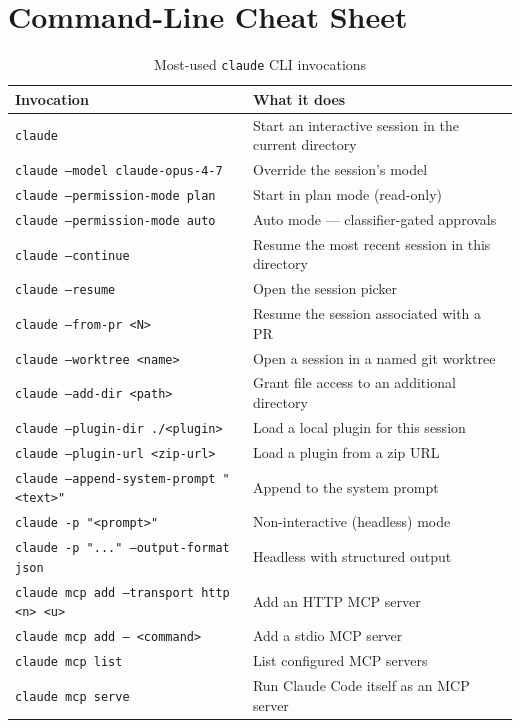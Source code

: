 \section{Command-Line Cheat Sheet}
\label{app:cli-cheat}

\begin{table}[ht]
\centering
\caption{Most-used \texttt{claude} CLI invocations}
\label{tab:app-cli}
\begin{tabularx}{\textwidth}{lX}
\toprule
\textbf{Invocation} & \textbf{What it does} \\
\midrule
\texttt{claude}                                  & Start an interactive session in the current directory \\
\texttt{claude --model claude-opus-4-7}          & Override the session's model \\
\texttt{claude --permission-mode plan}           & Start in plan mode (read-only) \\
\texttt{claude --permission-mode auto}           & Auto mode — classifier-gated approvals \\
\texttt{claude --continue}                       & Resume the most recent session in this directory \\
\texttt{claude --resume}                         & Open the session picker \\
\texttt{claude --from-pr <N>}                    & Resume the session associated with a PR \\
\texttt{claude --worktree <name>}                & Open a session in a named git worktree \\
\texttt{claude --add-dir <path>}                 & Grant file access to an additional directory \\
\texttt{claude --plugin-dir ./<plugin>}          & Load a local plugin for this session \\
\texttt{claude --plugin-url <zip-url>}           & Load a plugin from a zip URL \\
\texttt{claude --append-system-prompt "<text>"}  & Append to the system prompt \\
\texttt{claude -p "<prompt>"}                    & Non-interactive (headless) mode \\
\texttt{claude -p "..." --output-format json}    & Headless with structured output \\
\texttt{claude mcp add --transport http <n> <u>} & Add an HTTP MCP server \\
\texttt{claude mcp add -- <command>}             & Add a stdio MCP server \\
\texttt{claude mcp list}                         & List configured MCP servers \\
\texttt{claude mcp serve}                        & Run Claude Code itself as an MCP server \\
\bottomrule
\end{tabularx}
\end{table}

